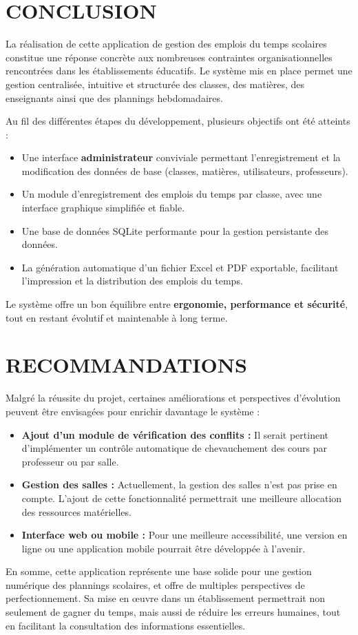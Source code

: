 \documentclass[english,12pt,a4paper]{report}
\begin{document}
\section{CONCLUSION}
La réalisation de cette application de gestion des emplois du temps scolaires constitue une réponse concrète aux nombreuses contraintes organisationnelles rencontrées dans les établissements éducatifs. Le système mis en place permet une gestion centralisée, intuitive et structurée des classes, des matières, des enseignants ainsi que des plannings hebdomadaires.

Au fil des différentes étapes du développement, plusieurs objectifs ont été atteints :
\begin{itemize}
 \item Une interface \textbf{administrateur} conviviale permettant l’enregistrement et la modification des données de base (classes, matières, utilisateurs, professeurs).
 \item Un module d’enregistrement des emplois du temps par classe, avec une interface graphique simplifiée et fiable.
 \item Une base de données SQLite performante pour la gestion persistante des données.
 \item La génération automatique d’un fichier Excel et PDF exportable, facilitant l’impression et la distribution des emplois du temps.
\end{itemize}

Le système offre un bon équilibre entre \textbf{ergonomie, performance et sécurité}, tout en restant évolutif et maintenable à long terme.

\section{RECOMMANDATIONS}
Malgré la réussite du projet, certaines améliorations et perspectives d’évolution peuvent être envisagées pour enrichir davantage le système :
\begin{itemize}
	\item \textbf{Ajout d’un module de vérification des conflits :} Il serait pertinent d’implémenter un contrôle automatique de chevauchement des cours par professeur ou par salle.
	\item \textbf{Gestion des salles :} Actuellement, la gestion des salles n'est pas prise en compte. L’ajout de cette fonctionnalité permettrait une meilleure allocation des ressources matérielles.
	\item \textbf{Interface web ou mobile :} Pour une meilleure accessibilité, une version en ligne ou une application mobile pourrait être développée à l’avenir.
\end{itemize}

En somme, cette application représente une base solide pour une gestion numérique des plannings scolaires, et offre de multiples perspectives de perfectionnement. Sa mise en œuvre dans un établissement permettrait non seulement de gagner du temps, mais aussi de réduire les erreurs humaines, tout en facilitant la consultation des informations essentielles.



\end{document}

